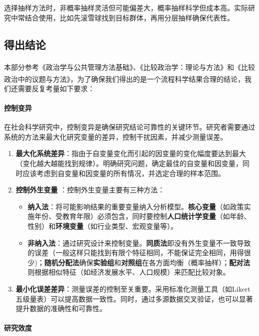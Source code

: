 选择抽样方法时，非概率抽样灵活但可能偏差大，概率抽样科学但成本高。实际研究中常结合使用，比如先滚雪球找到目标群体，再用分层抽样确保代表性。

\subsection{得出结论}

本部分参考《政治学与公共管理方法基础》、《比较政治学：理论与方法》\textsuperscript{\cite{5}}和《比较政治中的议题与方法》\textsuperscript{\cite{6}}，为了确保我们得出的是一个流程科学结果合理的结论，我们还需要反复考量如下要求：

\paragraph*{控制变异}

在社会科学研究中，控制变异是确保研究结论可靠性的关键环节。研究者需要通过系统的方法来最大化研究变量的差异，控制干扰因素，并减少测量误差。

\begin{enumerate}
	\item \textbf{最大化系统差异}：指由于自变量变化而引起的因变量的变化幅度要达到最大（变化越大越能找到规律）。明确研究问题，确定最佳的自变量和因变量，同时应该考虑到自变量和因变量的所有情况，并选定合理的样本范围。
	\item \textbf{控制外生变量} ：控制外生变量主要有三种方法：
	
	\begin{itemize}
		\item \textbf{纳入法}：将可能影响结果的重要变量纳入分析模型。\textbf{核心变量}（如政策实施年份、受教育年限）必须包含，同时要控制\textbf{人口统计学变量}（如年龄、性别）和\textbf{环境变量}（如行业类型、宏观变量等）。
		\item \textbf{非纳入法}：通过研究设计来控制变量。\textbf{同质法}即没有外生变量不一致导致的误差（一般这样只能找到有限个特征相同，不能保证完全相同，用得很少)；\textbf{随机分配法}确保\textbf{实验组}和\textbf{对照组}在各方面均衡（概率抽样）；\textbf{配对法}则根据相似特征（如经济发展水平、人口规模）来匹配比较对象。
	\end{itemize}
	\item
	\textbf{最小化误差差异}：测量误差的控制至关重要。采用标准化测量工具（如Likert五级量表）可以提高数据一致性。同时，通过多源数据交叉验证，也可以显著提升数据的准确性和可靠性。
\end{enumerate}

\paragraph*{研究效度}

